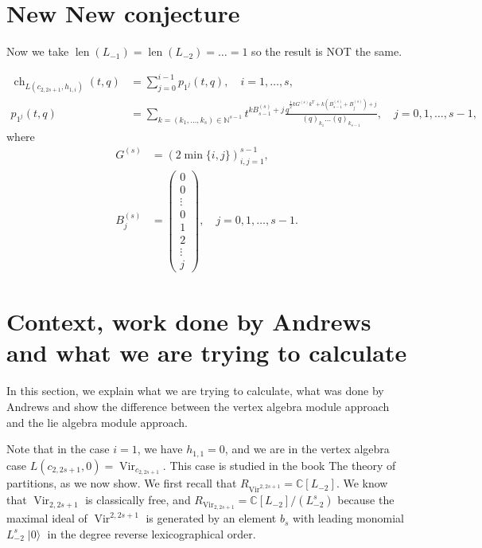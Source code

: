 \documentclass[a4paper, 12pt, reqno]{amsart}
\DeclareMathOperator{\Vir}{Vir}
\DeclareMathOperator{\ch}{ch}
\DeclareMathOperator{\len}{len}
\DeclareMathOperator{\vac}{|0\rangle}
\begin{document}
\section{New New conjecture}
\label{sec:new-new-conjecture}

Now we take $\len(L_{-1}) = \len(L_{-2}) = \dots = 1$ so the result is NOT the same.

\begin{align*}
  \ch_{L(c_{2, 2s + 1}, h_{1, i})}(t, q) &= \sum_{j = 0}^{i - 1}p_{1^j}(t, q), \quad i = 1, \dots, s, \\
  p_{1^j}(t, q) &= \sum_{k = (k_1, \dots, k_s) \in \mathbb{N}^{s - 1}}t^{kB^{(s)}_{s - 1} + j}\frac{q^{\frac{1}{2}kG^{(s)}k^T + k(B^{(s)}_{s - 1} + B^{(s)}_j) + j}}{(q)_{k_1}\dots(q)_{k_{s - 1}}}, \quad j = 0, 1, \dots, s - 1,
\end{align*}
where
\begin{align*}
  G^{(s)} &= (2\min\{i, j\})_{i, j = 1}^{s - 1}, \\
  B^{(s)}_j &=
              \left(\begin{smallmatrix}
                      0 \\
                      0 \\
                      \vdots \\
                      0 \\
                      1 \\
                      2 \\
                      \vdots \\
                      j
                    \end{smallmatrix}\right), \quad j = 0, 1, \dots, s - 1.  
\end{align*}

\section{Context, work done by Andrews and what we are trying to calculate}
\label{sec:context-work-done}

In this section, we explain what we are trying to calculate, what was done by Andrews and show the difference between the vertex algebra module approach and the lie algebra module approach.

Note that in the case $i = 1$, we have $h_{1, 1} = 0$, and we are in the vertex algebra case $L(c_{2, 2s + 1}, 0) = \Vir_{c_{2, 2s + 1}}$.
This case is studied in the book The theory of partitions, as we now show.
We first recall that $R_{\Vir^{2, 2s + 1}} = \mathbb{C}[L_{-2}]$.
We know that $\Vir_{2, 2s + 1}$ is classically free, and $R_{\Vir_{2, 2s + 1}} = \mathbb{C}[L_{-2}]/(L_{-2}^s)$ because the maximal ideal of $\Vir^{2, 2s + 1}$ is generated by an element $b_s$ with leading monomial $L_{-2}^s\vac$ in the degree reverse lexicographical order.
\end{document}

